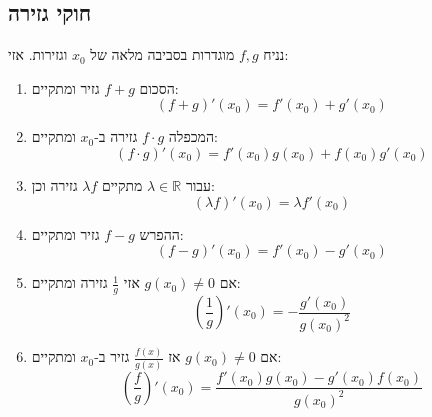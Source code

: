 \documentclass{tstextbook}
\begin{document}
\subsection{חוקי גזירה}

\begin{proposition}
נניח \(f,g\) מוגדרות בסביבה מלאה של \(x_{0}\) וגזירות. אזי:

  \begin{enumerate}
    \item הסכום \(f+g\) גזיר ומתקיים: 
$$(f+g)'(x_{0})= f'(x_{0})+g'(x_{0})$$


    \item המכפלה \(f\cdot g\) גזירה ב-\(x_{0}\) ומתקיים: 
$$\left( f\cdot g \right)'(x_{0})=f'(x_{0})g(x_{0})+f(x_{0})g'(x_{0})$$


    \item עבור \(\lambda \in \mathbb{R}\) מתקיים \(\lambda f\) גזירה וכן: 
$$\left( \lambda f \right)'(x_{0})=\lambda f'(x_{0})$$


    \item ההפרש \(f-g\) גזיר ומתקיים: 
$$(f-g)'(x_{0})= f'(x_{0})-g'(x_{0})$$


    \item אם \(g(x_{0})\neq 0\) אזי \(\frac{1}{g}\) גזירה ומתקיים: 
$$\left( \frac{1}{g} \right)'(x_{0})=-\frac{g'(x_{0})}{g(x_{0})^{2}}$$


    \item אם \(g(x_{0})\neq 0\) אז \(\frac{f(x)}{g(x)}\) גזיר ב-\(x_{0}\) ומתקיים: 
$$\left( \frac{f}{g} \right)'(x_{0})= \frac{f'(x_{0})g(x_{0})-g'(x_{0})f(x_{0})}{g(x_{0})^{2}}$$


  \end{enumerate}
\end{proposition}
\end{document}

